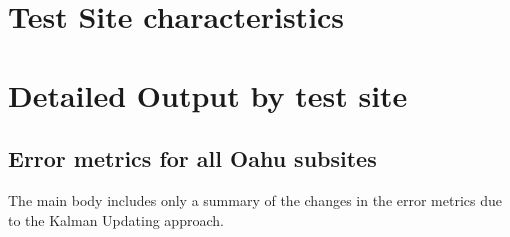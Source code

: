 \chapter{Test Site characteristics}


\chapter{Detailed Output by test site}\label{ch:subsite-appendix}
\section{Error metrics for all Oahu subsites}

The main body includes only a summary of the changes in the error metrics due to the Kalman Updating approach.


